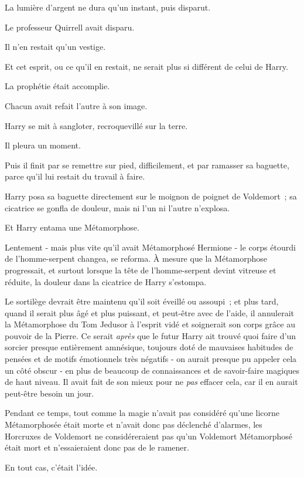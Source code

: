 La lumière d'argent ne dura qu'un instant, puis disparut.

Le professeur Quirrell avait disparu.

Il n'en restait qu'un vestige.

Et cet esprit, ou ce qu'il en restait, ne serait plus si différent de celui de Harry.

La prophétie était accomplie.

Chacun avait refait l'autre à son image.

Harry se mit à sangloter, recroquevillé sur la terre.

Il pleura un moment.

Puis il finit par se remettre sur pied, difficilement, et par ramasser sa baguette, parce qu'il lui restait du travail à faire.

\later

Harry posa sa baguette directement sur le moignon de poignet de Voldemort~; sa cicatrice se gonfla de douleur, mais ni l'un ni l'autre n'explosa.

Et Harry entama une Métamorphose.

Lentement - mais plus vite qu'il avait Métamorphosé Hermione - le corps étourdi de l'homme-serpent changea, se reforma. À mesure que la Métamorphose progressait, et surtout lorsque la tête de l'homme-serpent devint vitreuse et réduite, la douleur dans la cicatrice de Harry s'estompa.

Le sortilège devrait être maintenu qu'il soit éveillé ou assoupi~; et plus tard, quand il serait plus âgé et plus puissant, et peut-être avec de l'aide, il annulerait la Métamorphose du Tom Jedusor à l'esprit vidé et soignerait son corps grâce au pouvoir de la Pierre. Ce serait \emph{après} que le futur Harry ait trouvé quoi faire d'un sorcier presque entièrement amnésique, toujours doté de mauvaises habitudes de pensées et de motifs émotionnels très négatifs - on aurait presque pu appeler cela un côté obscur - en plus de beaucoup de connaissances et de savoir-faire magiques de haut niveau. Il avait fait de son mieux pour ne \emph{pas} effacer cela, car il en aurait peut-être besoin un jour.

Pendant ce temps, tout comme la magie n'avait pas considéré qu'une licorne Métamorphosée était morte et n'avait donc pas déclenché d'alarmes, les Horcruxes de Voldemort ne considéreraient pas qu'un Voldemort Métamorphosé était mort et n'essaieraient donc pas de le ramener.

En tout cas, c'était l'idée.

